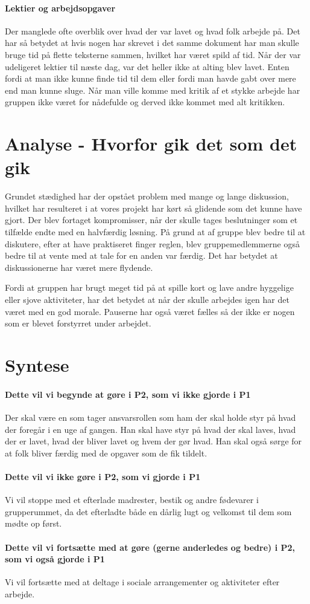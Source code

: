 \paragraph{Lektier og arbejdsopgaver}
Der manglede ofte overblik over hvad der var lavet og hvad folk arbejde på. Det har så betydet at hvis nogen har skrevet i det samme dokument har man skulle bruge tid på flette teksterne sammen, hvilket har været spild af tid. Når der var udeligeret lektier til næste dag, var det heller ikke at alting blev lavet. Enten fordi at man ikke kunne finde tid til dem eller fordi man havde gabt over mere end man kunne sluge. Når man ville komme med kritik af et stykke arbejde har gruppen ikke været for nådefulde og derved ikke kommet med alt kritikken. 

\section{Analyse - Hvorfor gik det som det gik}
Grundet stædighed har der opstået problem med mange og lange diskussion, hvilket har resulteret i at vores projekt har kørt så glidende som det kunne have gjort. Der blev fortaget kompromisser, når der skulle tages beslutninger som et tilfælde endte med en halvfærdig løsning.
På grund at af gruppe blev bedre til at diskutere, efter at have praktiseret finger reglen, blev gruppemedlemmerne også bedre til at vente med at tale for en anden var færdig. Det har betydet at diskussionerne har været mere flydende.

Fordi at gruppen har brugt meget tid på at spille kort og lave andre hyggelige eller sjove aktiviteter, har det betydet at når der skulle arbejdes igen har det været med en god morale. Pauserne har også været fælles så der ikke er nogen som er blevet forstyrret under arbejdet. 

\section{Syntese}
\paragraph{Dette vil vi begynde at gøre i P2, som vi ikke gjorde i P1}
Der skal være en som tager ansvarsrollen som ham der skal holde styr på hvad der foregår i en uge af gangen. Han skal have styr på hvad der skal laves, hvad der er lavet, hvad der bliver lavet og hvem der gør hvad. Han skal også sørge for at folk bliver færdig med de opgaver som de fik tildelt.


\paragraph{Dette vil vi ikke gøre i P2, som vi gjorde i P1}
Vi vil stoppe med et efterlade madrester, bestik og andre fødevarer i grupperummet, da det efterladte både en dårlig lugt og velkomst til dem som mødte op først. 

\paragraph{Dette vil vi fortsætte med at gøre (gerne anderledes og bedre) i P2, som vi også gjorde i P1}
Vi vil fortsætte med at deltage i sociale arrangementer og aktiviteter efter arbejde. 
